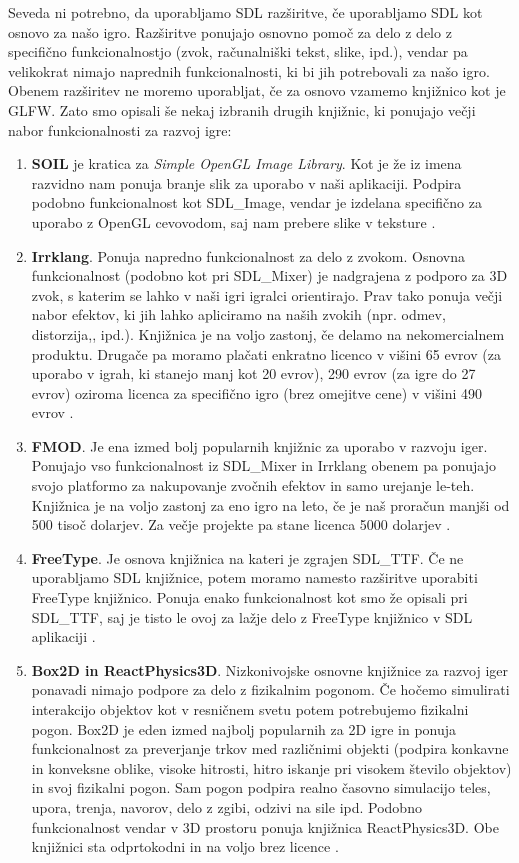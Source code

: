\documentclass[12pt,a4paper,twoside]{book}
\begin{document}
Seveda ni potrebno, da uporabljamo SDL razširitve, če uporabljamo SDL kot osnovo za našo igro. Razširitve ponujajo osnovno pomoč za delo z delo z specifično funkcionalnostjo (zvok, računalniški tekst, slike, ipd.), vendar pa velikokrat nimajo naprednih funkcionalnosti, ki bi jih potrebovali za našo igro. Obenem razširitev ne moremo uporabljat, če za osnovo vzamemo knjižnico kot je GLFW. Zato smo opisali še nekaj izbranih drugih knjižnic, ki ponujajo večji nabor funkcionalnosti za razvoj igre:
\begin{enumerate}
	\item \textbf{SOIL} je kratica za \textit{Simple OpenGL Image Library}. Kot je že iz imena razvidno nam ponuja branje slik za uporabo v naši aplikaciji. Podpira podobno funkcionalnost kot SDL\_Image, vendar je izdelana specifično za uporabo z OpenGL cevovodom, saj nam prebere slike v teksture \cite{soil}.
	\item \textbf{Irrklang}. Ponuja napredno funkcionalnost za delo z zvokom. Osnovna funkcionalnost (podobno kot pri SDL\_Mixer) je nadgrajena z podporo za 3D zvok, s katerim se lahko v naši igri igralci orientirajo. Prav tako ponuja večji nabor efektov, ki jih lahko apliciramo na naših zvokih (npr. odmev, distorzija,, ipd.). Knjižnica je na voljo zastonj, če delamo na nekomercialnem produktu. Drugače pa moramo plačati enkratno licenco v višini 65 evrov (za uporabo v igrah, ki stanejo manj kot 20 evrov), 290 evrov (za igre do 27 evrov) oziroma licenca za specifično igro (brez omejitve cene) v višini 490 evrov \cite{irrklang}. 
	\item \textbf{FMOD}. Je ena izmed bolj popularnih knjižnic za uporabo v razvoju iger. Ponujajo vso funkcionalnost iz SDL\_Mixer in Irrklang obenem pa ponujajo svojo platformo za nakupovanje zvočnih efektov in samo urejanje le-teh. Knjižnica je na voljo zastonj za eno igro na leto, če je naš proračun manjši od 500 tisoč dolarjev. Za večje projekte pa stane licenca 5000 dolarjev \cite{fmod}.
	\item \textbf{FreeType}. Je osnova knjižnica na kateri je zgrajen SDL\_TTF. Če ne uporabljamo SDL knjižnice, potem moramo namesto razširitve uporabiti FreeType knjižnico. Ponuja enako funkcionalnost kot smo že opisali pri SDL\_TTF, saj je tisto le ovoj za lažje delo z FreeType knjižnico v SDL aplikaciji \cite{freetype}.
	\item \textbf{Box2D in ReactPhysics3D}. Nizkonivojske osnovne knjižnice za razvoj iger ponavadi nimajo podpore za delo z fizikalnim pogonom. Če hočemo simulirati interakcijo objektov kot v resničnem svetu potem potrebujemo fizikalni pogon. Box2D je eden izmed najbolj popularnih za 2D igre in ponuja funkcionalnost za preverjanje trkov med različnimi objekti (podpira konkavne in konveksne oblike, visoke hitrosti, hitro iskanje pri visokem število objektov) in svoj fizikalni pogon. Sam pogon podpira realno časovno simulacijo teles, upora, trenja, navorov, delo z zgibi, odzivi na sile ipd. Podobno funkcionalnost vendar v 3D prostoru ponuja knjižnica ReactPhysics3D. Obe knjižnici sta odprtokodni in na voljo brez licence \cite{box2d} \cite{reactPhysics3d}.
\end{enumerate}
\end{document}
